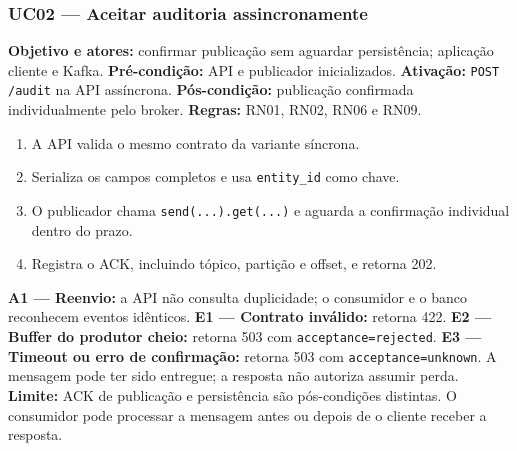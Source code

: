 \subsubsection{UC02 --- Aceitar auditoria assincronamente}
\textbf{Objetivo e atores:} confirmar publicação sem aguardar persistência; aplicação cliente e Kafka.
\textbf{Pré-condição:} API e publicador inicializados.
\textbf{Ativação:} \texttt{POST /audit} na API assíncrona.
\textbf{Pós-condição:} publicação confirmada individualmente pelo broker.
\textbf{Regras:} RN01, RN02, RN06 e RN09.
\begin{enumerate}
\item A API valida o mesmo contrato da variante síncrona.
\item Serializa os campos completos e usa \texttt{entity\_id} como chave.
\item O publicador chama \texttt{send(...).get(...)} e aguarda a confirmação individual dentro do prazo.
\item Registra o ACK, incluindo tópico, partição e offset, e retorna 202.
\end{enumerate}
\textbf{A1 --- Reenvio:} a API não consulta duplicidade; o consumidor e o banco reconhecem eventos idênticos.
\textbf{E1 --- Contrato inválido:} retorna 422.
\textbf{E2 --- Buffer do produtor cheio:} retorna 503 com \texttt{acceptance=rejected}.
\textbf{E3 --- Timeout ou erro de confirmação:} retorna 503 com \texttt{acceptance=unknown}. A mensagem pode ter sido entregue; a resposta não autoriza assumir perda.
\textbf{Limite:} ACK de publicação e persistência são pós-condições distintas. O consumidor pode processar a mensagem antes ou depois de o cliente receber a resposta.

